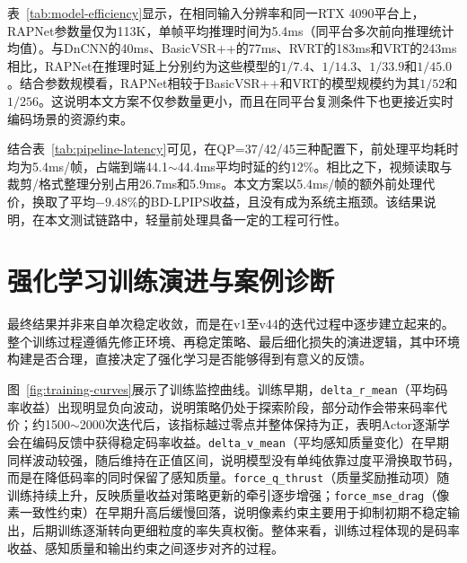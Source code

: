 表~\ref{tab:model-efficiency}显示，在相同输入分辨率和同一RTX 4090平台上，RAPNet参数量仅为113K，单帧平均推理时间为5.4ms（同平台多次前向推理统计均值）。与DnCNN的40ms、BasicVSR++的77ms、RVRT的183ms和VRT的243ms相比，RAPNet在推理时延上分别约为这些模型的$1/7.4$、$1/14.3$、$1/33.9$和$1/45.0$。结合参数规模看，RAPNet相较于BasicVSR++和VRT的模型规模约为其$1/52$和$1/256$。这说明本文方案不仅参数量更小，而且在同平台复测条件下也更接近实时编码场景的资源约束。

结合表~\ref{tab:pipeline-latency}可见，在QP=37/42/45三种配置下，前处理平均耗时均为5.4ms/帧，占端到端44.1$\sim$44.4ms平均时延的约12\%。相比之下，视频读取与裁剪/格式整理分别占用26.7ms和5.9ms。本文方案以5.4ms/帧的额外前处理代价，换取了平均$-9.48\%$的BD-LPIPS收益，且没有成为系统主瓶颈。该结果说明，在本文测试链路中，轻量前处理具备一定的工程可行性。


\section{强化学习训练演进与案例诊断}

最终结果并非来自单次稳定收敛，而是在v1至v44的迭代过程中逐步建立起来的。整个训练过程遵循先修正环境、再稳定策略、最后细化损失的演进逻辑，其中环境构建是否合理，直接决定了强化学习是否能够得到有意义的反馈。

图~\ref{fig:training-curves}展示了训练监控曲线。训练早期，\texttt{delta\_r\_mean}（平均码率收益）出现明显负向波动，说明策略仍处于探索阶段，部分动作会带来码率代价；约1500$\sim$2000次迭代后，该指标越过零点并整体保持为正，表明Actor逐渐学会在编码反馈中获得稳定码率收益。\texttt{delta\_v\_mean}（平均感知质量变化）在早期同样波动较强，随后维持在正值区间，说明模型没有单纯依靠过度平滑换取节码，而是在降低码率的同时保留了感知质量。\texttt{force\_q\_thrust}（质量奖励推动项）随训练持续上升，反映质量收益对策略更新的牵引逐步增强；\texttt{force\_mse\_drag}（像素一致性约束）在早期升高后缓慢回落，说明像素约束主要用于抑制初期不稳定输出，后期训练逐渐转向更细粒度的率失真权衡。整体来看，训练过程体现的是码率收益、感知质量和输出约束之间逐步对齐的过程。

